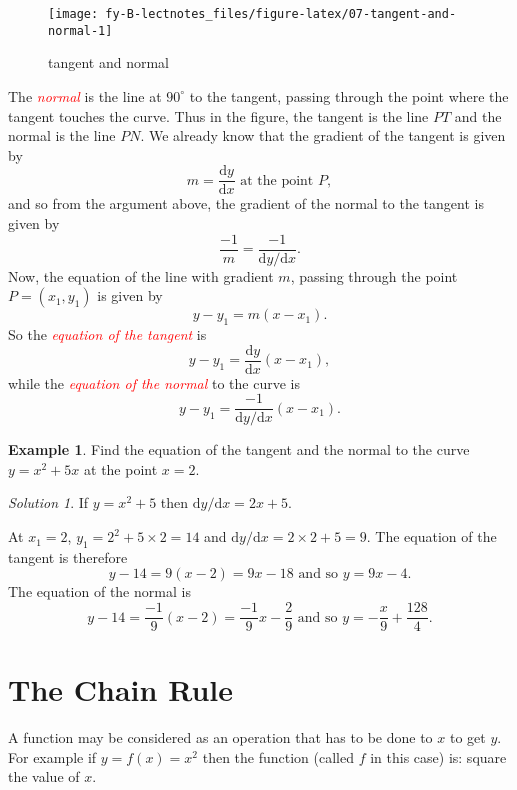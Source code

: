 \documentclass[
  11pt,
  oneside]{book}
\newcommand{\slide}{}
\theoremstyle{definition}
\theoremstyle{definition}
\newtheorem{example}{Example}[chapter]
\theoremstyle{definition}
\theoremstyle{definition}
\theoremstyle{remark}
\newtheorem*{solution}{Solution}
\begin{document}
\begin{figure}

{\centering \texttt{[image: fy-B-lectnotes\_files/figure-latex/07-tangent-and-normal-1]} 

}

\caption{tangent and normal}\label{fig:07-tangent-and-normal}
\end{figure}
\slide

The \textcolor{red}{\em normal} is the line at \(90^\circ\) to the tangent, passing through the point where the tangent touches the curve. Thus in the figure, the tangent is the line \(PT\) and the normal is the line \(PN\). We already know that the gradient of the tangent is given by
\[
m = \frac{\mathrm{d} y}{\mathrm{d} x}\text{ at the point }P,
\]
and so from the argument above, the gradient of the normal to the tangent is given by
\[
\frac{-1}{m} = \frac{-1}{{\mathrm{d} y/\mathrm{d} x}}.
\]
Now, the equation of the line with gradient \(m\), passing through the point \(P=(x_1,y_1)\) is given by
\[
y-y_1 = m(x-x_1).
\]
So the \textcolor{red}{\em equation of the tangent} is
\[
y - y_1 = \frac{\mathrm{d} y}{\mathrm{d} x}(x-x_1),
\]
while the \textcolor{red}{\em equation of the normal} to the curve is
\[
y - y_1 = \frac{-1}{{\mathrm{d} y/\mathrm{d} x}}(x-x_1).
\]
\slide

\begin{example}
Find the equation of the tangent and the normal to the curve \(y = x^2+5x\) at the point \(x=2\).
\end{example}

\begin{solution}
If \(y=x^2+5\) then \({\mathrm{d} y/\mathrm{d} x} = 2x+5\).

At \(x_1=2\), \(y_1 = 2^2 + 5\times2 = 14\) and \({\mathrm{d} y/\mathrm{d} x} = 2\times2+5=9\).
The equation of the tangent is therefore
\[
y-14=9(x-2) = 9x - 18\text{ and so }y = 9x-4.
\]
The equation of the normal is
\[
y-14=\frac{-1}{9}(x-2) = \frac{-1}{9}x - \frac{2}{9}\text{ and so }y = -\frac{x}{9}+\frac{128}{4}.
\]
\end{solution}

\slide

\section{The Chain Rule}\label{lecture-five}

A function may be considered as an operation that has to be done to \(x\) to get \(y\). For example if \(y = f(x) = x^2\) then the function (called \(f\) in this case) is: square the value of \(x\).
\end{document}

